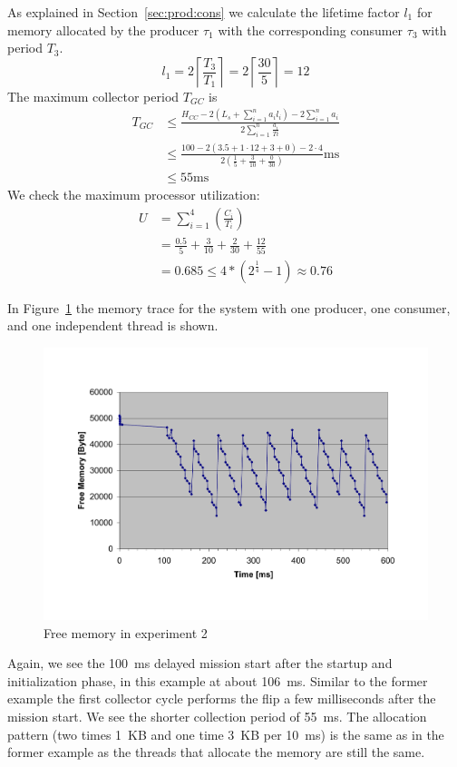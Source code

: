 As explained in Section~\ref{sec:prod:cons} we calculate the
lifetime factor $l_1$ for memory allocated by the producer $\tau_1$
with the corresponding consumer $\tau_3$ with period $T_3$.
\begin{equation*}
    l_1 = 2\left\lceil\frac{T_3}{T_1}\right\rceil
        = 2\left\lceil\frac{30}{5}\right\rceil
        = 12
\end{equation*}
%
The maximum collector period $T_{GC}$ is
\begin{align*}
    T_{GC} & \le \frac{H_{CC}-2\left(L_s+\sum_{i=1}^{n} a_i l_i\right)-2\sum_{i=1}^{n} a_i}
        {2\sum_{i=1}^{n} \frac{a_i}{Ti}} \\
           & \le \frac{100-2(3.5+1\cdot12+3+0)-2\cdot4}
           {2\left(\frac{1}{5}+\frac{3}{10}+\frac{0}{30}\right)}\mbox{ms}\\
           & \le 55\mbox{ms}
\end{align*}
We check the maximum processor utilization:
\begin{align*}
    U & = \sum_{i=1}^{4}\left(\frac{C_i}{T_i}\right)\\
      & = \frac{0.5}{5} + \frac{3}{10} + \frac{2}{30} + \frac{12}{55}\\
      & = 0.685 \le 4*(2^{\frac{1}{4}}-1) \approx 0.76
\end{align*}

In Figure~\ref{fig:ex2:mem} the memory trace for the system with one
producer, one consumer, and one independent thread is shown.
\begin{figure}
\begin{center}
    \includegraphics[width=\excelwidth]{jvm/gc_ex2}
    \caption{Free memory in experiment 2}
\label{fig:ex2:mem}
\end{center}
\end{figure}
%
Again, we see the 100~ms delayed mission start after the startup and
initialization phase, in this example at about 106~ms. Similar to
the former example the first collector cycle performs the flip a few
milliseconds after the mission start. We see the shorter collection
period of 55~ms. The allocation pattern (two times 1~KB and one time
3~KB per 10~ms) is the same as in the former example as the threads
that allocate the memory are still the same.

